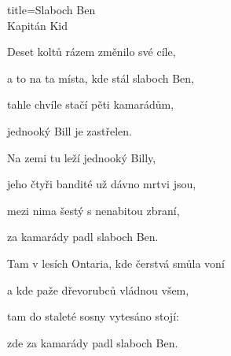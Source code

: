 \begin{song}{title=\predtitle\centering Slaboch Ben \\\large Kapitán Kid  \vspace*{-0.3cm}}
\begin{centerjustified}
	
\sloka	
	Deset koltů rázem změnilo své cíle,
	
	a to na ta místa, kde stál slaboch Ben,
	
	tahle chvíle stačí pěti kamarádům,
	
	jednooký Bill je zastřelen.

	
\sloka	
	Na zemi tu leží jednooký Billy,
	
	jeho čtyři bandité už dávno mrtvi jsou,
	
	mezi nima šestý s nenabitou zbraní,
	
	za kamarády padl slaboch Ben.

	
\sloka	
	Tam v lesích Ontaria, kde čerstvá smůla voní

	a kde paže dřevorubců vládnou všem,
	
	tam do staleté sosny vytesáno stojí:
	
	zde za kamarády padl slaboch Ben.



\end{centerjustified}
\setcounter{Slokočet}{0}
\end{song}
